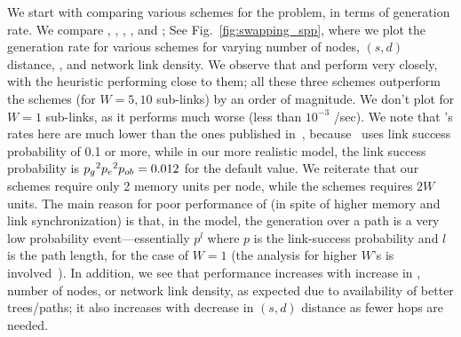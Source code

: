\sloppypar
{}
We start with comparing various schemes for the \spp problem, in terms of \eps generation
rate. We compare \dpa, \dpo, \dpalt, \naive, and \qcast; 
See Fig.~\ref{fig:swapping_spp}, where we plot the \eps generation rate for various schemes for
varying number of nodes, $(s, d)$ distance, \bp, and network
link density. We observe that \dpa and \dpo perform very closely, with the \dpalt heuristic
performing close to them; all these three schemes outperform the \qcast schemes (for $W=5, 10$ sub-links) by an 
order of magnitude. We don't plot \qcast for $W=1$ sub-links, 
as it performs much worse (less than $10^{-3}$ \eps/sec).
We note that \qcast's \eps rates here are much lower than the ones published in~\cite{sigcomm20}, because~\cite{sigcomm20} uses link \eps success 
probability of 0.1 or more, while in our
more realistic model, the link \eps success probability is 
$\mbox{$p_g$}^2\mbox{$p_e$}^2\mbox{$p_{ob}$} = 0.012$ for the default \bp value.
We reiterate that our schemes require only 2 memory 
units per node, while the \qcast schemes requires $2W$ units. 
The main reason for poor performance of \qcast (in spite of higher memory and link synchronization) 
is that, in the \os model, the \eps generation
over a path is a very low probability event---essentially $p^l$ where $p$ is the link-\eps success probability and $l$ is the path length, for the case of $W=1$
(the analysis for higher $W$'s is involved~\cite{sigcomm20}).
In addition, 
we see that performance increases with increase in \bp, number of nodes, or network link density, as expected due to availability of better trees/paths; it also increases with decrease in $(s,d)$ distance as fewer hops are needed.


